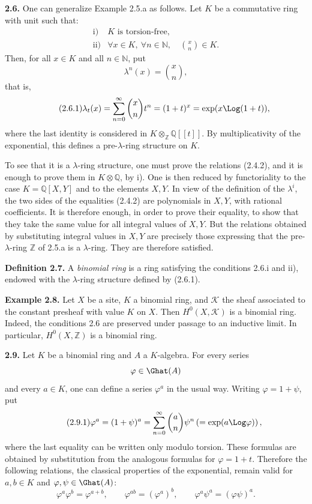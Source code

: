 \documentclass[11pt]{article}
\begin{document}
\textbf{2.6.} One can generalize Example 2.5.a as follows. Let \(K\) be a commutative ring with unit such that:
\[
\begin{array}{ll}
\text{i)}& K\text{ is torsion-free},\\
\text{ii)}& \forall x\in K,\ \forall n\in\mathbb N,\quad \binom{x}{n}\in K .
\end{array}
\]
Then, for all \(x\in K\) and all \(n\in\mathbb N\), put
\[
  \lambda^n(x)=\binom{x}{n},
\]
that is,
\begin{equation}\tag{2.6.1}
  \lambda_t(x)=\sum_{n=0}^{\infty}\binom{x}{n}t^n
  =(1+t)^x=\exp(x\Log(1+t)),
\end{equation}
where the last identity is considered in \(K\otimes_{\mathbb Z}\mathbb Q[[t]]\). By multiplicativity of the exponential, this defines a pre-\(\lambda\)-ring structure on \(K\).

To see that it is a \(\lambda\)-ring structure, one must prove the relations (2.4.2), and it is enough to prove them in \(K\otimes\mathbb Q\), by i). One is then reduced by functoriality to the case \(K=\mathbb Q[X,Y]\) and to the elements \(X,Y\). In view of the definition of the \(\lambda^i\), the two sides of the equalities (2.4.2) are polynomials in \(X,Y\), with rational coefficients. It is therefore enough, in order to prove their equality, to show that they take the same value for all integral values of \(X,Y\). But the relations obtained by substituting integral values in \(X,Y\) are precisely those expressing that the pre-\(\lambda\)-ring \(\mathbb Z\) of 2.5.a is a \(\lambda\)-ring. They are therefore satisfied.

\textbf{Definition 2.7.} A \emph{binomial ring} is a ring satisfying the conditions 2.6.i and ii), endowed with the \(\lambda\)-ring structure defined by (2.6.1).

\textbf{Example 2.8.} Let \(X\) be a site, \(K\) a binomial ring, and \(\mathcal K\) the sheaf associated to the constant presheaf with value \(K\) on \(X\). Then \(H^0(X,\mathcal K)\) is a binomial ring. Indeed, the conditions 2.6 are preserved under passage to an inductive limit. In particular, \(H^0(X,\mathbb Z)\) is a binomial ring.

\textbf{2.9.} Let \(K\) be a binomial ring and \(A\) a \(K\)-algebra. For every series
\[
  \varphi\in\Ghat(A)
\]
and every \(a\in K\), one can define a series \(\varphi^a\) in the usual way. Writing \(\varphi=1+\psi\), put
\begin{equation}\tag{2.9.1}
  \varphi^a=(1+\psi)^a
  =
  \sum_{n=0}^{\infty}\binom{a}{n}\psi^n
  \left(=\exp(a\Log\varphi)\right),
\end{equation}
where the last equality can be written only modulo torsion. These formulas are obtained by substitution from the analogous formulas for \(\varphi=1+t\). Therefore the following relations, the classical properties of the exponential, remain valid for \(a,b\in K\) and \(\varphi,\psi\in\Ghat(A)\):
\begin{equation}\tag{2.9.2}
  \varphi^a\varphi^b=\varphi^{a+b},\qquad
  \varphi^{ab}=(\varphi^a)^b,\qquad
  \varphi^a\psi^a=(\varphi\psi)^a .
\end{equation}
\end{document}

